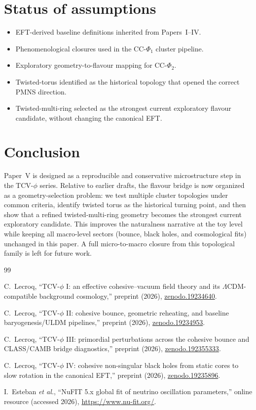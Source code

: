 \documentclass[aps,prd,onecolumn,nofootinbib,superscriptaddress]{revtex4-2}
\begin{document}
\section{Status of assumptions}
\begin{itemize}
  \item EFT-derived baseline definitions inherited from Papers~I--IV.
  \item Phenomenological closures used in the CC-$\Phi_1$ cluster pipeline.
  \item Exploratory geometry-to-flavour mapping for CC-$\Phi_2$.
  \item Twisted-torus identified as the historical topology that opened the correct PMNS direction.
  \item Twisted-multi-ring selected as the strongest current exploratory flavour candidate, without changing the canonical EFT.
\end{itemize}

\section{Conclusion}
Paper~V is designed as a reproducible and conservative microstructure step in the TCV-$\phi$ series.
Relative to earlier drafts, the flavour bridge is now organized as a geometry-selection problem:
we test multiple cluster topologies under common criteria, identify twisted torus as the historical turning point, and then show that a refined twisted-multi-ring geometry becomes the strongest current exploratory candidate.
This improves the naturalness narrative at the toy level while keeping all macro-level sectors (bounce, black holes, and cosmological fits) unchanged in this paper.
A full micro-to-macro closure from this topological family is left for future work.

\begin{thebibliography}{99}

C.~Lecroq, ``TCV-$\phi$ I: an effective cohesive--vacuum field theory and its $\Lambda$CDM-compatible background cosmology,'' preprint (2026), \href{https://doi.org/10.5281/zenodo.19234640}{zenodo.19234640}.

C.~Lecroq, ``TCV-$\phi$ II: cohesive bounce, geometric reheating, and baseline baryogenesis/ULDM pipelines,'' preprint (2026), \href{https://doi.org/10.5281/zenodo.19234953}{zenodo.19234953}.

C.~Lecroq, ``TCV-$\phi$ III: primordial perturbations across the cohesive bounce and CLASS/CAMB bridge diagnostics,'' preprint (2026), \href{https://doi.org/10.5281/zenodo.192355333}{zenodo.192355333}.

C.~Lecroq, ``TCV-$\phi$ IV: cohesive non-singular black holes from static cores to slow rotation in the canonical EFT,'' preprint (2026), \href{https://doi.org/10.5281/zenodo.19235896}{zenodo.19235896}.

I.~Esteban \textit{et al.}, ``NuFIT 5.x global fit of neutrino oscillation parameters,'' online resource (accessed 2026), \url{https://www.nu-fit.org/}.

\end{thebibliography}
\end{document}
